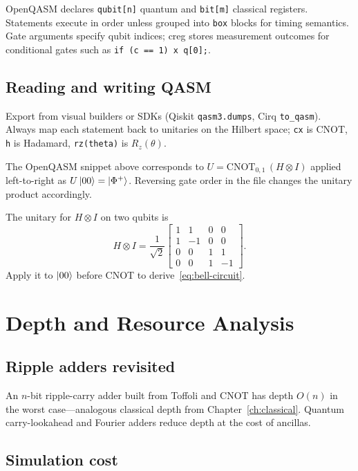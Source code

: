 OpenQASM declares \texttt{qubit[n]} quantum and \texttt{bit[m]} classical registers. Statements execute in order unless grouped into \texttt{box} blocks for timing semantics. Gate arguments specify qubit indices; creg stores measurement outcomes for conditional gates such as \texttt{if (c == 1) x q[0];}.

\subsection{Reading and writing QASM}

Export from visual builders or SDKs (Qiskit \texttt{qasm3.dumps}, Cirq \texttt{to\_qasm}). Always map each statement back to unitaries on the Hilbert space; \texttt{cx} is CNOT, \texttt{h} is Hadamard, \texttt{rz(theta)} is $R_z(\theta)$.

\begin{example}
The OpenQASM snippet above corresponds to $U=\mathrm{CNOT}_{0,1}\,(H\otimes I)$ applied left-to-right as $U\ket{00}=\ket{\Phi^+}$. Reversing gate order in the file changes the unitary product accordingly.
\end{example}

\begin{example}
The unitary for $H\otimes I$ on two qubits is
\[
H\otimes I=\frac{1}{\sqrt{2}}\begin{bmatrix}
1&1&0&0\\1&-1&0&0\\0&0&1&1\\0&0&1&-1
\end{bmatrix}.
\]
Apply it to $\ket{00}$ before CNOT to derive~\eqref{eq:bell-circuit}.
\end{example}

\section{Depth and Resource Analysis}
\label{sec:depth}

\subsection{Ripple adders revisited}

An $n$-bit ripple-carry adder built from Toffoli and CNOT has depth $O(n)$ in the worst case---analogous classical depth from Chapter~\ref{ch:classical}. Quantum carry-lookahead and Fourier adders reduce depth at the cost of ancillas.

\subsection{Simulation cost}

